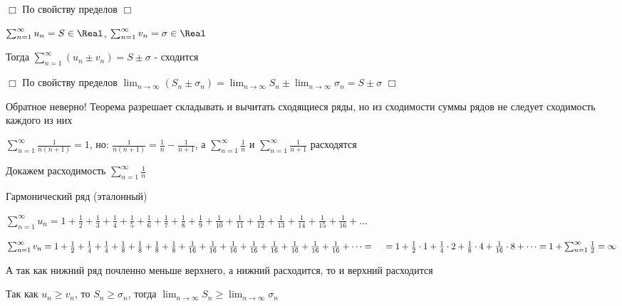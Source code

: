 \documentclass[12pt]{article}
\begin{document}
    \begin{tcolorbox}
        $\Box$ По свойству пределов $\Box$
    \end{tcolorbox}

    \begin{MyTheorem}
         $\sum_{n = 1}^\infty u_n = S \in \Real$, $\sum_{n = 1}^\infty v_n = \sigma \in \Real$

        Тогда $\sum_{n = 1}^\infty (u_n \pm v_n) = S \pm \sigma$ - сходится
    \end{MyTheorem}

    \begin{tcolorbox}
        $\Box$ По свойству пределов $\lim_{n \to\infty} (S_n \pm \sigma_n) = \lim_{n \to\infty} S_n \pm \lim_{n \to\infty} \sigma_n = S \pm \sigma$ $\Box$
    \end{tcolorbox}

    \Nota Обратное неверно! Теорема разрешает складывать и вычитать сходящиеся ряды, но из сходимости суммы рядов не следует сходимость каждого из них

    \Exs $\sum_{n = 1}^\infty \frac{1}{n (n + 1)} = 1$, \quad но: $\frac{1}{n (n + 1)} = \frac{1}{n} - \frac{1}{n + 1}$,
    а $\sum_{n = 1}^\infty \frac{1}{n}$ и $\sum_{n = 1}^\infty \frac{1}{n + 1}$ расходятся

    \Nota Докажем расходимость $\sum_{n = 1}^\infty \frac{1}{n}$

    \hypertarget{harmonicseries}{}

    \Exs Гармонический ряд (эталонный)

    $\sum_{n = 1}^\infty u_n = 1 + \frac{1}{2} + \frac{1}{3} + \frac{1}{4} + \frac{1}{5} + \frac{1}{6} + \frac{1}{7} + \frac{1}{8} + \frac{1}{9} + \frac{1}{10} + \frac{1}{11} + \frac{1}{12} + \frac{1}{13} + \frac{1}{14} + \frac{1}{15} + \frac{1}{16} + \dots$

    $\sum_{n = 1}^\infty v_n = 1 + \frac{1}{2} + \frac{1}{4} + \frac{1}{4} + \frac{1}{8} + \frac{1}{8} + \frac{1}{8} + \frac{1}{8} + \frac{1}{16} + \frac{1}{16} + \frac{1}{16} + \frac{1}{16} + \frac{1}{16} + \frac{1}{16} + \frac{1}{16} + \frac{1}{16} + \dots = \\
    \quad = 1 + \frac{1}{2} \cdot 1 + \frac{1}{4} \cdot 2 + \frac{1}{8} \cdot 4 + \frac{1}{16} \cdot 8 + \dots = 1 + \sum_{n = 1}^\infty \frac{1}{2} = \infty$

    А так как нижний ряд почленно меньше верхнего, а нижний расходится, то и верхний расходится

    Так как $u_n \geq v_n$, то $S_n \geq \sigma_n$, тогда $\lim_{n \to\infty} S_n \geq \lim_{n \to\infty} \sigma_n$
\end{document}
